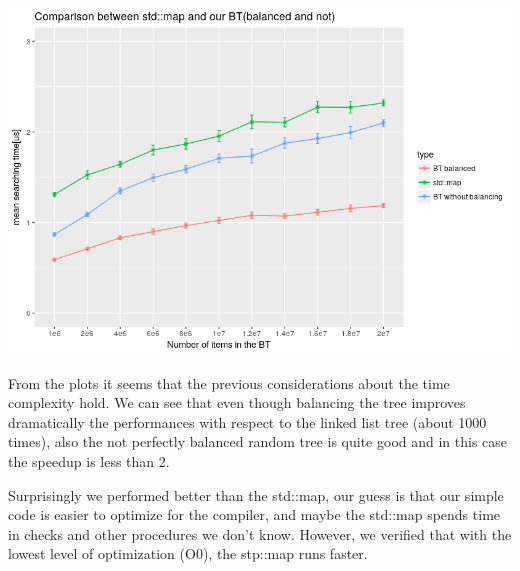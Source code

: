 \documentclass[a4paper,11pt]{article}
\begin{document}
\includegraphics[height=10cm]{./map_vs_BT.png}\\

From the plots it seems that the previous considerations about the time complexity hold.
We can see that even though balancing the tree improves dramatically the performances with respect to the linked list tree (about 1000 times), also the not perfectly balanced random tree is quite good and in this case the speedup is less than 2.

Surprisingly we performed better than the std::map, our guess is that our simple code is easier to optimize for the compiler, and maybe the std::map spends time in checks and other procedures we don't know.
However, we verified that with the lowest level of optimization (O0), the stp::map runs faster.


\vspace{2cm}
\end{document}
